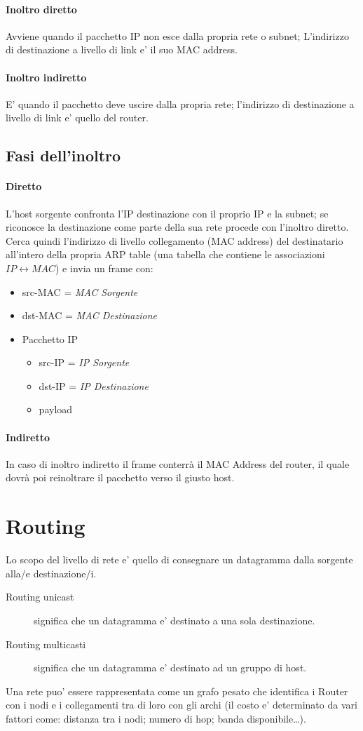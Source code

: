 \paragraph{Inoltro diretto}
Avviene quando il pacchetto IP non esce dalla propria rete o subnet; L'indirizzo di destinazione a livello di link e' il suo MAC address.
\paragraph{Inoltro indiretto}
E' quando il pacchetto deve uscire dalla propria rete; l'indirizzo di destinazione a livello di link e' quello del router.
\subsection{Fasi dell'inoltro}
\paragraph{Diretto}
L'host sorgente confronta l'IP destinazione con il proprio IP e la subnet; se riconosce la destinazione come parte della sua rete procede con l'inoltro diretto. 
Cerca quindi l'indirizzo di livello collegamento (MAC address) del destinatario all'intero della propria ARP table (una tabella che contiene le associazioni $IP \leftrightarrow MAC$) e invia un frame con:
\begin{itemize}
    \item src-MAC = \textit{MAC Sorgente}
    \item dst-MAC = \textit{MAC Destinazione}
    \item Pacchetto IP
    \begin{itemize}
        \item src-IP = \textit{IP Sorgente}
        \item dst-IP = \textit{IP Destinazione}
        \item payload
    \end{itemize}
\end{itemize}
\paragraph{Indiretto}
In caso di inoltro indiretto il frame conterrà il MAC Address del router, il quale dovrà poi reinoltrare il pacchetto verso il giusto host.

\section{Routing}
Lo scopo del livello di rete e' quello di consegnare un datagramma dalla sorgente alla{\tiny /e} destinazione{\tiny /i}.
\begin{description}
    \item[Routing unicast] significa che un datagramma e' destinato a una sola destinazione.
    \item[Routing multicasti] significa che un datagramma e' destinato ad un gruppo di host.   
\end{description}
Una rete puo' essere rappresentata come un grafo pesato che identifica i Router con i nodi e i collegamenti tra di loro con gli archi (il costo e' determinato da vari fattori come: distanza tra i nodi; numero di hop; banda disponibile\dots).
